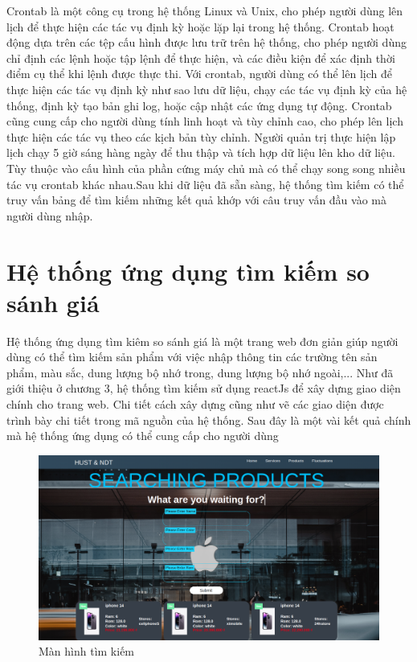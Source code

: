 \documentclass[../DoAn.tex]{subfiles}
\begin{document}
Crontab là một công cụ trong hệ thống Linux và Unix, cho phép người dùng lên lịch để thực hiện các tác vụ định kỳ hoặc lặp lại trong hệ thống. Crontab hoạt động dựa trên các tệp cấu hình được lưu trữ trên hệ thống, cho phép người dùng chỉ định các lệnh hoặc tập lệnh để thực hiện, và các điều kiện để xác định thời điểm cụ thể khi lệnh được thực thi. Với crontab, người dùng có thể lên lịch để thực hiện các tác vụ định kỳ như sao lưu dữ liệu, chạy các tác vụ định kỳ của hệ thống, định kỳ tạo bản ghi log, hoặc cập nhật các ứng dụng tự động. Crontab cũng cung cấp cho người dùng tính linh hoạt và tùy chỉnh cao, cho phép lên lịch thực hiện các tác vụ theo các kịch bản tùy chỉnh. Người quản trị thực hiện lập lịch chạy 5 giờ sáng hàng ngày để thu thập và tích hợp dữ liệu lên kho dữ liệu. Tùy thuộc vào cấu hình của phần cứng máy chủ mà có thể chạy song song nhiều tác vụ crontab khác nhau.Sau khi dữ liệu đã sẵn sàng, hệ thống tìm kiếm có thể truy vấn bảng để tìm kiếm những kết quả khớp với câu truy vấn đầu vào mà người dùng nhập. 
 
\section{Hệ thống ứng dụng tìm kiếm so sánh giá}
Hệ thống ứng dụng tìm kiêm so sánh giá là một trang web đơn giản giúp người dùng có thể tìm kiếm sản phẩm với việc nhập thông tin các trường tên sản phẩm, màu sắc, dung lượng bộ nhớ trong, dung lượng bộ nhớ ngoài,... Như đã giới thiệu ở chương 3, hệ thống tìm kiếm sử dụng reactJs để xây dựng giao diện chính cho trang web. Chi tiết cách xây dựng cũng như vẽ các giao diện được trình bày chi tiết trong mã nguồn của hệ thống. Sau đây là một vài kết quả chính mà hệ thống ứng dụng có thể cung cấp cho người dùng

\begin{figure}[H]
    \centering
    \includegraphics[scale=0.25]{Hinhve/searchUI_01.png}
    \caption{Màn hình tìm kiếm}
    \label{fig:my_label}
\end{figure}
\end{document}
